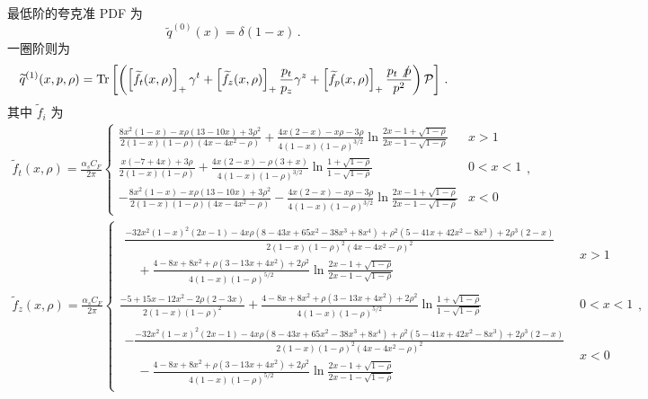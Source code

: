 最低阶的夸克准 PDF 为
\begin{equation}
\widetilde{q}^{(0)}(x)=\delta(1-x)\,.
\end{equation}
一圈阶则为
\begin{align}\label{eq:one_loop_quasiPDF}
\widetilde{q}^{(1)}(x,p,\rho)=\mbox{Tr}\left[\left(\left[\widetilde{f}_t(x,\rho)\right]_+\gamma^t+\left[\widetilde{f}_z(x,\rho)\right]_+\frac{p_t}{p_z}\gamma^z+\left[\widetilde{f}_p(x,\rho)\right]_+\frac{p_t\slashed{p}}{p^2}\right){\cal P}\right]\,.
\end{align}
其中 $\widetilde{f}_i$ 为
\begin{align}
\widetilde{f}_t(x,\rho)=\frac{\alpha_s C_F}{2\pi}\left\{
\begin{array}{lc}
\frac{8x^2(1-x)-x\rho(13-10x)+3\rho^2}{2(1-x)(1-\rho)(4x-4x^2-\rho)}+\frac{4x(2-x)-x\rho-3\rho}{4(1-x)(1-\rho)^{3/2}}\ln\frac{2x-1+\sqrt{1-\rho}}{2x-1-\sqrt{1-\rho}} & x>1\\
%
\frac{x(-7+4x)+3\rho}{2(1-x)(1-\rho)}+\frac{4x(2-x)-\rho(3+x)}{4(1-x)(1-\rho)^{3/2}}\ln\frac{1+\sqrt{1-\rho}}{1-\sqrt{1-\rho}} & 0<x<1\\
%
-\frac{8x^2(1-x)-x\rho(13-10x)+3\rho^2}{2(1-x)(1-\rho)(4x-4x^2-\rho)}-\frac{4x(2-x)-x\rho-3\rho}{4(1-x)(1-\rho)^{3/2}}\ln\frac{2x-1+\sqrt{1-\rho}}{2x-1-\sqrt{1-\rho}} & x<0
\end{array}\right.,
\end{align}
\begin{align}
\widetilde{f}_z(x,\rho)=\frac{\alpha_s C_F}{2\pi}\left\{
\begin{array}{lc}
\begin{array}{l}
\frac{-32x^2(1-x)^2(2x-1)-4x\rho(8-43x+65x^2-38x^3+8x^4)+\rho^2(5-41x+42x^2-8x^3)+2\rho^3(2-x)}{2(1-x)(1-\rho)^2(4x-4x^2-\rho)^2}\\
\quad+\frac{4-8x+8x^2+\rho(3-13x+4x^2)+2\rho^2}{4(1-x)(1-\rho)^{5/2}}\ln\frac{2x-1+\sqrt{1-\rho}}{2x-1-\sqrt{1-\rho}}
\end{array} & x>1\\
\frac{-5+15x-12x^2-2\rho(2-3x)}{2(1-x)(1-\rho)^2}+\frac{4-8x+8x^2+\rho(3-13x+4x^2)+2\rho^2}{4(1-x)(1-\rho)^{5/2}}\ln\frac{1+\sqrt{1-\rho}}{1-\sqrt{1-\rho}} & 0<x<1\\
\begin{array}{l}
-\frac{-32x^2(1-x)^2(2x-1)-4x\rho(8-43x+65x^2-38x^3+8x^4)+\rho^2(5-41x+42x^2-8x^3)+2\rho^3(2-x)}{2(1-x)(1-\rho)^2(4x-4x^2-\rho)^2}\\
\quad-\frac{4-8x+8x^2+\rho(3-13x+4x^2)+2\rho^2}{4(1-x)(1-\rho)^{5/2}}\ln\frac{2x-1+\sqrt{1-\rho}}{2x-1-\sqrt{1-\rho}}
\end{array} & x<0
\end{array}\right.,
\end{align}
